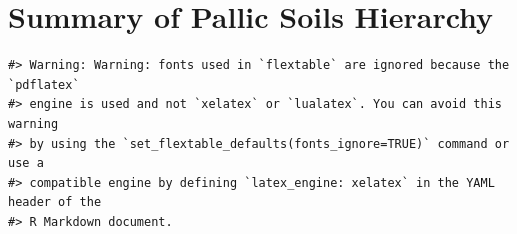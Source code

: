 \documentclass[
  letterpaper,
  DIV=11,
  numbers=noendperiod]{scrreprt}
\begin{document}
\hypertarget{sec-sum-P}{%
\section{Summary of Pallic Soils Hierarchy}\label{sec-sum-P}}

\begin{verbatim}
#> Warning: Warning: fonts used in `flextable` are ignored because the `pdflatex`
#> engine is used and not `xelatex` or `lualatex`. You can avoid this warning
#> by using the `set_flextable_defaults(fonts_ignore=TRUE)` command or use a
#> compatible engine by defining `latex_engine: xelatex` in the YAML header of the
#> R Markdown document.
\end{verbatim}

\providecommand{\docline}[3]{\noalign{\global\setlength{\arrayrulewidth}{#1}}\arrayrulecolor[HTML]{#2}\cline{#3}}

\setlength{\tabcolsep}{2pt}

\renewcommand*{\arraystretch}{1.5}
\end{document}
